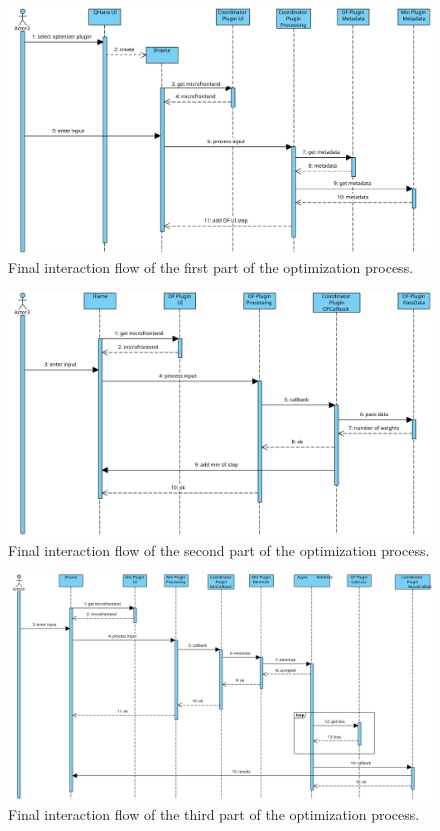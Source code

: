 \documentclass[
  a4paper,  %
  twoside,  %
  bibliography=totoc,
  headsepline,
  cleardoublepage=empty,
  parskip=half,
  draft=false
]{scrbook}
\begin{document}
\newpage
\begin{figure}[ht]
  \centering
  \includegraphics[width=\textwidth]{graphics/interaction_flow_1.svg}
  \caption{Final interaction flow of the first part of the optimization process.}
  \label{fig:interaction_flow_part1}
\end{figure}

\begin{figure}[ht]
  \centering
  \includegraphics[width=\textwidth]{graphics/interaction_flow_2.svg}
  \caption{Final interaction flow of the second part of the optimization process.}
  \label{fig:interaction_flow_part2}
\end{figure}

\begin{figure}[ht]
  \centering
  \includegraphics[width=\textwidth]{graphics/interaction_flow_3.svg}
  \caption{Final interaction flow of the third part of the optimization process.}
  \label{fig:interaction_flow_part3}
\end{figure}
\end{document}
